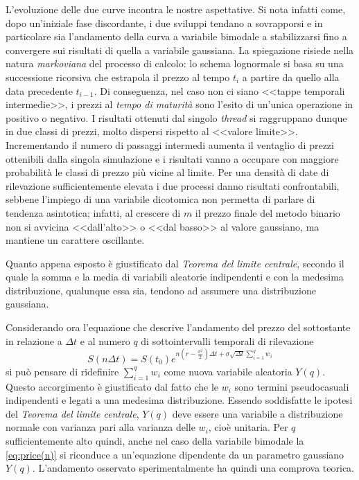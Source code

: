 L'evoluzione delle due curve incontra le nostre aspettative. Si nota infatti come, dopo un'iniziale fase discordante, i due sviluppi tendano a sovrapporsi e in particolare sia l'andamento della curva a variabile bimodale a stabilizzarsi fino a convergere sui risultati di quella a variabile gaussiana. La spiegazione risiede nella natura \textit{markoviana} del processo di calcolo: lo schema lognormale si basa su una successione ricorsiva che estrapola il prezzo al tempo $t_i$ a partire da quello alla data precedente $t_{i-1}$. Di conseguenza, nel caso non ci siano <<tappe temporali intermedie>>, i prezzi al \textit{tempo di maturità} sono l'esito di un'unica operazione in positivo o negativo. I risultati ottenuti dal singolo \textit{thread} si raggruppano dunque in due classi di prezzi, molto dispersi rispetto al <<valore limite>>. Incrementando il numero di passaggi intermedi aumenta il ventaglio di prezzi ottenibili dalla singola simulazione e i risultati vanno a occupare con maggiore probabilità le classi di prezzo più vicine al limite. Per una densità di date di rilevazione sufficientemente elevata i due processi danno risultati confrontabili, sebbene l'impiego di una variabile dicotomica non permetta di parlare di tendenza asintotica; infatti, al crescere di $m$ il prezzo finale del metodo binario non si avvicina <<dall'alto>> o <<dal basso>> al valore gaussiano, ma mantiene un carattere oscillante.

Quanto appena esposto è giustificato dal \textit{Teorema del limite centrale}, secondo il quale la somma e la media di variabili aleatorie indipendenti e con la medesima distribuzione, qualunque essa sia, tendono ad assumere una distribuzione gaussiana.

Considerando ora l'equazione che descrive l'andamento del prezzo del sottostante in relazione a $\Delta t$ e al numero $q$ di sottointervalli temporali di rilevazione
\begin{equation}
    S(n \Delta t) = S(t_0) e^{n (r - \frac{\sigma^2}{2}) \Delta t + \sigma \sqrt{\Delta t} \displaystyle\sum_{i=1}^q w_i}
    \label{eq:price(n)}
\end{equation}
si può pensare di ridefinire $\displaystyle\sum_{i=1}^q w_i$ come nuova variabile aleatoria $Y(q)$. Questo accorgimento è giustificato dal fatto che le ${w_i}$ sono termini pseudocasuali indipendenti e legati a una medesima distribuzione. Essendo soddisfatte le ipotesi del \textit{Teorema del limite centrale}, $Y(q)$ deve essere una variabile a distribuzione normale con varianza pari alla varianza delle ${w_i}$, cioè unitaria. Per $q$ sufficientemente alto quindi, anche nel caso della variabile bimodale la \eqref{eq:price(n)} si riconduce a un'equazione dipendente da un parametro gaussiano $Y(q)$. L'andamento osservato sperimentalmente ha quindi una comprova teorica.

